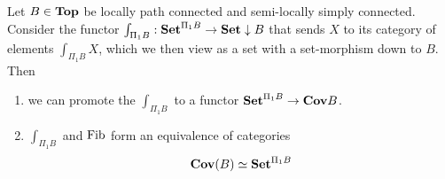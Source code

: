 \documentclass[./main.tex]{subfiles}
\begin{document}
\begin{prop}
  
  Let $B \in \mathbf{Top}$ be locally path connected and 
  semi-locally simply connected.
  Consider the functor $\int_{\Pi_1 B} : \mathbf{Set}^{\Pi_1 B} \to \mathbf{Set} \downarrow B$
  that sends $X$ to its category of elements $\int_{\Pi_1 B} X$,
  which we then view as a set with a set-morphism down to $B$.
  Then \begin{enumerate}
    \item we can promote the $\int_{\Pi_1 B}$ to a functor 
    $\mathbf{Set}^{\Pi_1 B} \to \mathbf{Cov} B$. 
    \item $\int_{\Pi_1 B}$ and $\operatorname{Fib}$ form an 
    equivalence of categories \[
      \mathbf{Cov}(B) \simeq \mathbf{Set}^{\Pi_1 B}
    \]
  \end{enumerate}
\end{prop}
\end{document}
